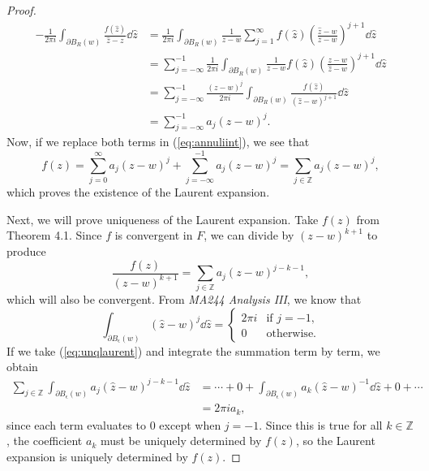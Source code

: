 \documentclass[a4paper]{article}
\begin{document}
\begin{proof}
\begin{align}
 - \frac{1}{2\pi i }\int_{\partial B_{R}(w)} { \frac{f(\hat{z})}{\hat{z}-z} \dd\hat{z}} 
 &= \frac{1}{2\pi i }\int_{\partial B_{R}(w)} \frac{1}{z-w} \sum_{j=1}^{\infty} f(\hat{z}) \left( \frac{\hat{z}-w}{z-w}\right) ^{j+1}\dd\hat{z} \nonumber \\
 & =\sum_{j=-\infty}^{-1}\frac{1}{2\pi i }\int_{\partial B_{R}(w)} \frac{1}{z-w} f(\hat{z}) \left( \frac{z-w}{\hat{z}-w}\right) ^{j+1}\dd\hat{z} \nonumber \\
& = \sum_{j=-\infty}^{-1}\frac{(z-w)^{j}}{2\pi i }\int_{\partial B_{R}(w)}   \frac{f(\hat{z})}{(\hat{z}-w) ^{j+1}}\dd\hat{z} \nonumber \\ 
& \label{eq:principalconverges}=\sum_{j=-\infty}^{-1} a_{j} (z-w)^{j}. 
\end{align}
Now, if we replace both terms in (\ref{eq:annuliint}), we see that
\[f(z) = \sum_{j=0}^{\infty} a_{j}(z-w)^{j}+ \sum_{j=-\infty}^{-1} a_{j} (z-w)^{j}= \sum_{j \in \mathbb{Z}} a_{j}(z-w)^{j},\]
which proves the existence of the Laurent expansion.

Next, we will prove uniqueness of the Laurent expansion. Take $f(z)$ from Theorem 4.1. Since $f$ is convergent in $F$, we can divide by $(z-w)^{k+1}$ to produce
\begin{equation}\label{eq:unqlaurent} \frac{f(z)}{(z-w)^{k+1}} = \sum_{j \in \mathbb{Z}} a_{j}(z-w)^{j-k-1}, \end{equation}
which will also be convergent.
From \textit{MA244 Analysis III}, we know that
\begin{equation}\label{eq:minus1integral} \int_{\partial B_{\upvarepsilon}(w)}(\hat{z}-w)^{j}\dd\hat{z}= \begin{cases} 2\pi i & \text{if } j=-1 , \\ 0 & \text{otherwise.} \end{cases} \end{equation}
If we take (\ref{eq:unqlaurent}) and integrate the summation term by term, we obtain
\begin{align}\sum_{j \in \mathbb{Z}} \int_{\partial B_{\upvarepsilon}(w)} a_{j}(\hat{z}-w)^{j-k-1} \dd\hat{z} &= \dotsb + 0 + \int_{\partial B_{\upvarepsilon}(w)} a_{k}(\hat{z}-w)^{-1} \dd\hat{z} + 0 + \dotsb \nonumber \\
&= 2\pi i a_{k}, \nonumber 
\end{align}
since each term evaluates to 0 except when $j = -1$. Since this is true for all $k \in \mathbb{Z}$, the coefficient $a_{k}$ must be uniquely determined by $f(z)$, so the Laurent expansion is uniquely determined by $f(z)$.
\end{proof}
\end{document}

